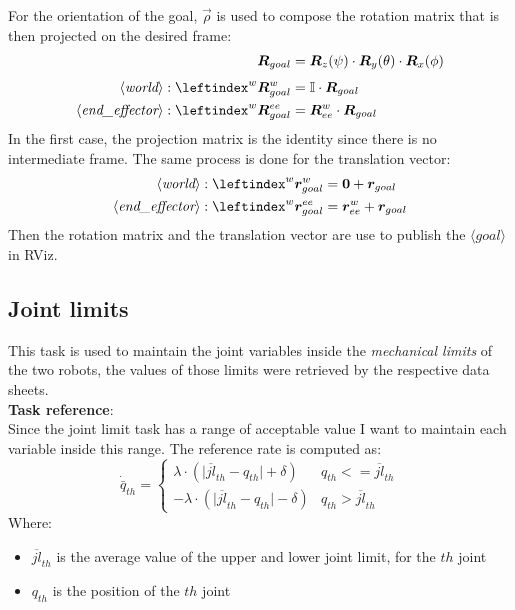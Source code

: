 \noindent For the orientation of the goal, $\vec{\rho}$ is used to compose the rotation matrix that is then projected on the desired frame:
\begin{align}
	\vec{R}_{goal} &= \vec{R}_{z}(\psi) \cdot \vec{R}_{y}(\theta) \cdot \vec{R}_{x}(\phi) \\[4pt]
	\langle\textit{world}\rangle: \leftindex^{w}{\vec{R}}^{w}_{goal} &= \mathbb{I} \cdot \vec{R}_{goal} \\
	\langle\textit{end\_effector}\rangle: \leftindex^{w}{\vec{R}}^{ee}_{goal} &= \vec{R}_{ee}^{w} \cdot \vec{R}_{goal}
\end{align}
In the first case, the projection matrix is the identity since there is no intermediate frame.
The same process is done for the translation vector:
\begin{align}
	\langle\textit{world}\rangle: \leftindex^{w}{\vec{r}}^{w}_{goal} &= \vec{0} + \vec{r}_{goal}\\
	\langle\textit{end\_effector}\rangle: \leftindex^{w}{\vec{r}}^{ee}_{goal} &= \vec{r}_{ee}^{w} + \vec{r}_{goal}
\end{align}
Then the rotation matrix and the translation vector are use to publish the $\langle\textit{goal}\rangle$ in RViz.

\subsection{Joint limits}
This task is used to maintain the joint variables inside the \textit{mechanical limits} of the two robots, the values of those limits were retrieved by the respective data sheets.\\
\textbf{Task reference}:\\
\noindent Since the joint limit task has a range of acceptable value I want to maintain each variable inside this range.
The reference rate is computed as:\\
\begin{equation}
	\dot{\bar{q}}_{th} =  
	\begin{cases}
		\lambda \cdot (\lvert \overline{jl}_{th} - q_{th}  \rvert + \delta) &  q_{th} <= \overline{jl}_{th} \\[5pt]
		-\lambda \cdot (\lvert \overline{jl}_{th} - q_{th}  \rvert - \delta) &  q_{th} > \overline{jl}_{th} 
	\end{cases}
\end{equation}
Where:
\begin{itemize}
	\item $\overline{jl}_{th}$ is the average value of the upper and lower joint limit, for the $th$ joint
	\item $q_{th}$ is the position of the $th$ joint
\end{itemize}

